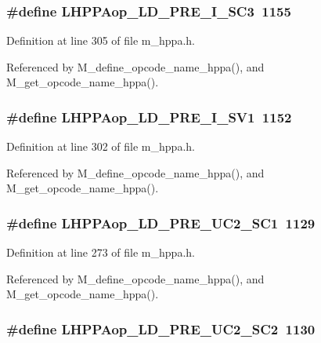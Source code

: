 \subsubsection{\setlength{\rightskip}{0pt plus 5cm}\#define LHPPAop\_\-LD\_\-PRE\_\-I\_\-SC3~1155}\label{m__hppa_8h_2b1a5d7a93eafdfde71f838c55cdc179}




Definition at line 305 of file m\_\-hppa.h.

Referenced by M\_\-define\_\-opcode\_\-name\_\-hppa(), and M\_\-get\_\-opcode\_\-name\_\-hppa().
\subsubsection{\setlength{\rightskip}{0pt plus 5cm}\#define LHPPAop\_\-LD\_\-PRE\_\-I\_\-SV1~1152}\label{m__hppa_8h_5b816ea2dc3bc78e2c3c0387a0605cf4}




Definition at line 302 of file m\_\-hppa.h.

Referenced by M\_\-define\_\-opcode\_\-name\_\-hppa(), and M\_\-get\_\-opcode\_\-name\_\-hppa().
\subsubsection{\setlength{\rightskip}{0pt plus 5cm}\#define LHPPAop\_\-LD\_\-PRE\_\-UC2\_\-SC1~1129}\label{m__hppa_8h_0a45296429e06a1b4f96bb43d9c71d44}




Definition at line 273 of file m\_\-hppa.h.

Referenced by M\_\-define\_\-opcode\_\-name\_\-hppa(), and M\_\-get\_\-opcode\_\-name\_\-hppa().
\subsubsection{\setlength{\rightskip}{0pt plus 5cm}\#define LHPPAop\_\-LD\_\-PRE\_\-UC2\_\-SC2~1130}\label{m__hppa_8h_d035a50be4758de62c67d955808257d8}




